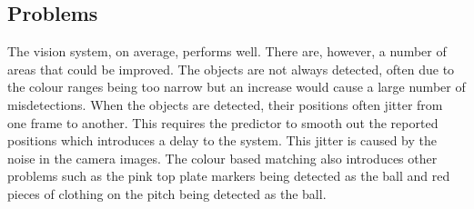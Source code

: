 
\subsection{Problems}

The vision system, on average, performs well. There are, however, a number of
areas that could be improved. The objects are not always detected, often due to
the colour ranges being too narrow but an increase would cause a large number
of misdetections. When the objects are detected, their positions often jitter
from one frame to another. This requires the predictor to smooth out the
reported positions which introduces a delay to the system. This jitter is caused
by the noise in the camera images. The colour based matching also introduces
other problems such as the pink top plate markers being detected as the ball and
red pieces of clothing on the pitch being detected as the ball.

